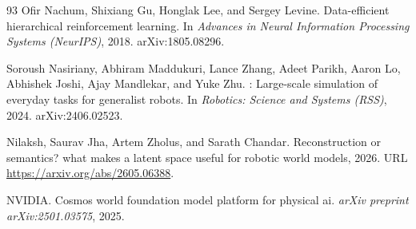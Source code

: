 \begin{thebibliography}{93}
Ofir Nachum, Shixiang Gu, Honglak Lee, and Sergey Levine.
\newblock Data-efficient hierarchical reinforcement learning.
\newblock In \emph{Advances in Neural Information Processing Systems
  (NeurIPS)}, 2018.
\newblock arXiv:1805.08296.

Soroush Nasiriany, Abhiram Maddukuri, Lance Zhang, Adeet Parikh, Aaron Lo,
  Abhishek Joshi, Ajay Mandlekar, and Yuke Zhu.
: Large-scale simulation of everyday tasks for generalist
  robots.
\newblock In \emph{Robotics: Science and Systems (RSS)}, 2024.
\newblock arXiv:2406.02523.

Nilaksh, Saurav Jha, Artem Zholus, and Sarath Chandar.
\newblock Reconstruction or semantics? what makes a latent space useful for
  robotic world models, 2026.
\newblock URL \url{https://arxiv.org/abs/2605.06388}.

{NVIDIA}.
\newblock Cosmos world foundation model platform for physical ai.
\newblock \emph{arXiv preprint arXiv:2501.03575}, 2025.


\end{thebibliography}
